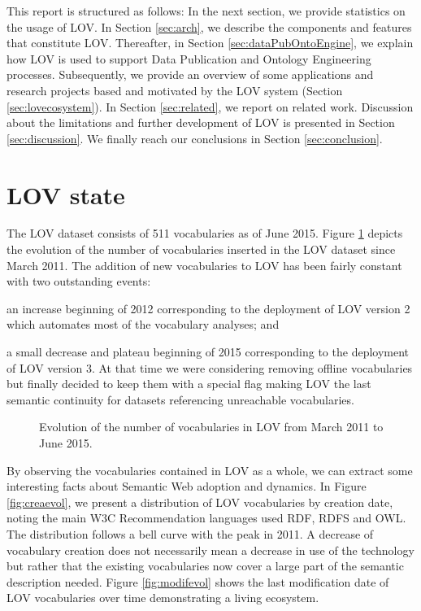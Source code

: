 \documentclass{iosart2c}
\begin{document}
This report is structured as follows: In the next section, we provide statistics on the usage of LOV. In Section \ref{sec:arch}, we describe the components and features that constitute LOV. Thereafter,  in Section \ref{sec:dataPubOntoEngine}, we explain how LOV is used to support Data Publication and Ontology Engineering processes. Subsequently, we provide an overview of some applications and research projects based and motivated by the LOV system (Section \ref{sec:lovecosystem}). In Section \ref{sec:related}, we report on related work. Discussion about the limitations and further development of LOV is presented in Section \ref{sec:discussion}. We finally reach our conclusions in Section \ref{sec:conclusion}.

\section{LOV state}\label{sec:state}
The LOV dataset consists of 511 vocabularies as of June 2015. Figure \ref{fig:evolLOV} depicts the evolution of the number of vocabularies inserted in the LOV dataset since March 2011. The addition of new vocabularies to LOV has been fairly constant with two outstanding events: 
\begin{inparaenum}[1)] 
	\item an increase beginning of 2012 corresponding to the deployment of LOV version 2 which automates most of the vocabulary analyses; and
	\item a small decrease and plateau beginning of 2015 corresponding to the deployment of LOV version 3. At that time we were considering  removing offline vocabularies but finally decided to keep them with a special flag making LOV the last semantic continuity for datasets referencing unreachable vocabularies.
\end{inparaenum} 

\begin{figure}[htb]
   \resizebox{1.04\linewidth}{!}{}
   \caption{\label{fig:evolLOV} Evolution of the number of vocabularies in LOV from March 2011 to June 2015.}
\end{figure}



By observing the vocabularies contained in LOV as a whole, we can extract some interesting facts about Semantic Web adoption and dynamics. In Figure \ref{fig:creaevol}, we present a distribution of LOV vocabularies by creation date, noting the main W3C Recommendation languages used RDF, RDFS and OWL. The distribution follows a bell curve with the peak in 2011. A decrease of vocabulary creation does not necessarily mean a decrease in use of the technology but rather that the existing vocabularies now cover a large part of the semantic description needed. Figure \ref{fig:modifevol} shows the last modification date of LOV vocabularies over time demonstrating a living ecosystem. 
\end{document}
